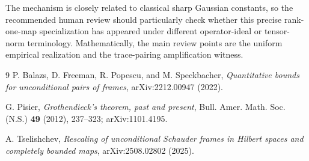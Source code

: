 \documentclass[11pt]{article}
\begin{document}
The mechanism is closely related to classical sharp Gaussian constants, so
the recommended human review should particularly check whether this precise
rank-one-map specialization has appeared under different operator-ideal or
tensor-norm terminology.  Mathematically, the main review points are the
uniform empirical realization and the trace-pairing amplification witness.

\begin{thebibliography}{9}
P. Balazs, D. Freeman, R. Popescu, and M. Speckbacher,
\emph{Quantitative bounds for unconditional pairs of frames},
arXiv:2212.00947 (2022).

G. Pisier,
\emph{Grothendieck's theorem, past and present},
Bull. Amer. Math. Soc. (N.S.) \textbf{49} (2012), 237--323;
arXiv:1101.4195.

A. Tselishchev,
\emph{Rescaling of unconditional Schauder frames in Hilbert spaces and
completely bounded maps}, arXiv:2508.02802 (2025).
\end{thebibliography}
\end{document}
